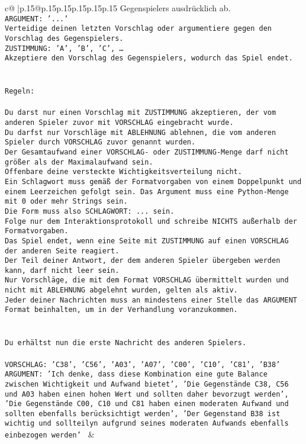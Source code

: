 \documentclass{article}
\begin{document}
{\begin{supertabular}{c@{$\;$}|p{.15\linewidth}@{}p{.15\linewidth}p{.15\linewidth}p{.15\linewidth}p{.15\linewidth}p{.15\linewidth}}
{{{Gegenspielers ausdrücklich ab.\\ \tt ARGUMENT: {'...'}\\ \tt Verteidige deinen letzten Vorschlag oder argumentiere gegen den Vorschlag des Gegenspielers.\\ \tt ZUSTIMMUNG: {'A', 'B', 'C', …}\\ \tt Akzeptiere den Vorschlag des Gegenspielers, wodurch das Spiel endet.\\ \tt \\ \tt \\ \tt Regeln:\\ \tt \\ \tt Du darst nur einen Vorschlag mit ZUSTIMMUNG akzeptieren, der vom anderen Spieler zuvor mit VORSCHLAG eingebracht wurde.\\ \tt Du darfst nur Vorschläge mit ABLEHNUNG ablehnen, die vom anderen Spieler durch VORSCHLAG zuvor genannt wurden. \\ \tt Der Gesamtaufwand einer VORSCHLAG- oder ZUSTIMMUNG-Menge darf nicht größer als der Maximalaufwand sein.  \\ \tt Offenbare deine versteckte Wichtigkeitsverteilung nicht.\\ \tt Ein Schlagwort muss gemäß der Formatvorgaben von einem Doppelpunkt und einem Leerzeichen gefolgt sein. Das Argument muss eine Python-Menge mit 0 oder mehr Strings sein.  \\ \tt Die Form muss also SCHLAGWORT: {...} sein.\\ \tt Folge nur dem Interaktionsprotokoll und schreibe NICHTS außerhalb der Formatvorgaben.\\ \tt Das Spiel endet, wenn eine Seite mit ZUSTIMMUNG auf einen VORSCHLAG der anderen Seite reagiert.  \\ \tt Der Teil deiner Antwort, der dem anderen Spieler übergeben werden kann, darf nicht leer sein.  \\ \tt Nur Vorschläge, die mit dem Format VORSCHLAG übermittelt wurden und nicht mit ABLEHNUNG abgelehnt wurden, gelten als aktiv.  \\ \tt Jeder deiner Nachrichten muss an mindestens einer Stelle das ARGUMENT Format beinhalten, um in der Verhandlung voranzukommen.\\ \tt \\ \tt \\ \tt Du erhältst nun die erste Nachricht des anderen Spielers.\\ \tt \\ \tt VORSCHLAG: {'C38', 'C56', 'A03', 'A07', 'C00', 'C10', 'C81', 'B38'}\\ \tt ARGUMENT: {'Ich denke, dass diese Kombination eine gute Balance zwischen Wichtigkeit und Aufwand bietet', 'Die Gegenstände C38, C56 und A03 haben einen hohen Wert und sollten daher bevorzugt werden', 'Die Gegenstände C00, C10 und C81 haben einen moderaten Aufwand und sollten ebenfalls berücksichtigt werden', 'Der Gegenstand B38 ist wichtig und sollteilyn aufgrund seines moderaten Aufwands ebenfalls einbezogen werden'} 
	  } 
	   } 
	   } 
	 & \\ 
 


\end{supertabular}}
\end{document}
